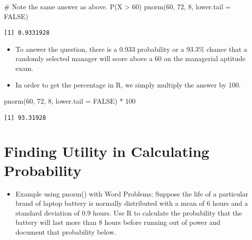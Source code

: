 \documentclass[
  letterpaper,
  DIV=11,
  numbers=noendperiod]{scrreprt}
\newenvironment{Shaded}{\begin{snugshade}}{\end{snugshade}}
\newcommand{\AttributeTok}[1]{\textcolor[rgb]{0.40,0.45,0.13}{#1}}
\newcommand{\CommentTok}[1]{\textcolor[rgb]{0.37,0.37,0.37}{#1}}
\newcommand{\ConstantTok}[1]{\textcolor[rgb]{0.56,0.35,0.01}{#1}}
\newcommand{\DecValTok}[1]{\textcolor[rgb]{0.68,0.00,0.00}{#1}}
\newcommand{\FunctionTok}[1]{\textcolor[rgb]{0.28,0.35,0.67}{#1}}
\newcommand{\NormalTok}[1]{\textcolor[rgb]{0.00,0.23,0.31}{#1}}
\newcommand{\SpecialCharTok}[1]{\textcolor[rgb]{0.37,0.37,0.37}{#1}}
\providecommand{\tightlist}{%
  \setlength{\itemsep}{0pt}\setlength{\parskip}{0pt}}\usepackage{longtable,booktabs,array}
\begin{document}
\begin{Shaded}
\begin{Highlighting}[]
\CommentTok{\# Note the same answer as above.  P(X \textgreater{} 60)}
\FunctionTok{pnorm}\NormalTok{(}\DecValTok{60}\NormalTok{, }\DecValTok{72}\NormalTok{, }\DecValTok{8}\NormalTok{, }\AttributeTok{lower.tail =} \ConstantTok{FALSE}\NormalTok{)}
\end{Highlighting}
\end{Shaded}

\begin{verbatim}
[1] 0.9331928
\end{verbatim}

\begin{itemize}
\item
  To answer the question, there is a 0.933 probability or a 93.3\%
  chance that a randomly selected manager will score above a 60 on the
  managerial aptitude exam.
\item
  In order to get the percentage in R, we simply multiply the answer by
  100.
\end{itemize}

\begin{Shaded}
\begin{Highlighting}[]
\FunctionTok{pnorm}\NormalTok{(}\DecValTok{60}\NormalTok{, }\DecValTok{72}\NormalTok{, }\DecValTok{8}\NormalTok{, }\AttributeTok{lower.tail =} \ConstantTok{FALSE}\NormalTok{) }\SpecialCharTok{*} \DecValTok{100}
\end{Highlighting}
\end{Shaded}

\begin{verbatim}
[1] 93.31928
\end{verbatim}

\section{Finding Utility in Calculating
Probability}\label{finding-utility-in-calculating-probability}

\begin{itemize}
\tightlist
\item
  Example using pnorm() with Word Problems: Suppose the life of a
  particular brand of laptop battery is normally distributed with a mean
  of 6 hours and a standard deviation of 0.9 hours. Use R to calculate
  the probability that the battery will last more than 8 hours before
  running out of power and document that probability below.
\end{itemize}
\end{document}
